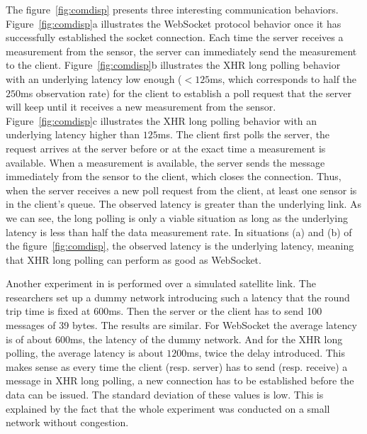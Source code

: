 \documentclass[10pt,journal,compsoc]{IEEEtran}
\newcommand{\ws}{WebSocket}
\begin{document}
The figure~\ref{fig:comdisp} presents three interesting communication behaviors.
Figure~\ref{fig:comdisp}a illustrates the \ws{} protocol behavior once it has successfully established the socket connection. Each time the server receives a measurement from the sensor, the server can immediately send the measurement to the client.
Figure~\ref{fig:comdisp}b illustrates the XHR long polling behavior with an underlying latency low enough ($< 125 $ms, which corresponds to half the $250$ms observation rate) for the client to establish a poll request that the server will keep until it receives a new measurement from the sensor. %
Figure~\ref{fig:comdisp}c illustrates the XHR long polling behavior with an underlying latency higher than $125$ms.
The client first polls the server, the request arrives at the server before or at the exact time a measurement is available.
When a measurement is available, the server sends the message immediately from the sensor to the client, which closes the connection.
Thus, when the server receives a new poll request from the client, at least one sensor is in the client's queue.
The observed latency is greater than the underlying link.
As we can see, the long polling is only a viable situation as long as the underlying latency is less than half the data measurement rate.
In  situations (a) and (b) of the figure~\ref{fig:comdisp}, the observed latency is the underlying latency, meaning that XHR long polling can perform as good as \ws{}.



Another experiment in \cite{collinalatency} is performed over a simulated satellite link.
The researchers set up a dummy network introducing such a latency that the round trip time is fixed at $600$ms.
Then the server or the client has to send 100 messages of 39 bytes. The results are similar.
For \ws{} the average latency is of about $600$ms, the latency of the dummy network. And for the XHR long polling, the average latency is about $1200$ms, twice the delay introduced.
This makes sense as every time the client (resp. server) has to send (resp. receive) a message in XHR long polling, a new connection has to be established before the data can be issued.
The standard deviation of these values is low.
This is explained by the fact that the whole experiment was conducted on a small network without congestion.
\end{document}
